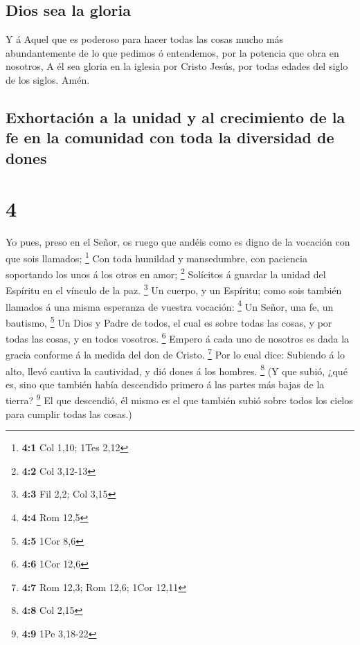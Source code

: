 \hypertarget{dios-sea-la-gloria}{%
\subsection{Dios sea la gloria}\label{dios-sea-la-gloria}}

 Y á Aquel que es poderoso para hacer todas las cosas mucho
más abundantemente de lo que pedimos ó entendemos, por la potencia que
obra en nosotros,  A él sea gloria en la iglesia por Cristo
Jesús, por todas edades del siglo de los siglos. Amén.

\hypertarget{exhortaciuxf3n-a-la-unidad-y-al-crecimiento-de-la-fe-en-la-comunidad-con-toda-la-diversidad-de-dones}{%
\subsection{Exhortación a la unidad y al crecimiento de la fe en la
comunidad con toda la diversidad de
dones}\label{exhortaciuxf3n-a-la-unidad-y-al-crecimiento-de-la-fe-en-la-comunidad-con-toda-la-diversidad-de-dones}}

\hypertarget{section-3}{%
\section{4}\label{section-3}}

 Yo pues, preso en el Señor, os ruego que andéis como es
digno de la vocación con que sois llamados; \footnote{\textbf{4:1} Col
  1,10; 1Tes 2,12}  Con toda humildad y mansedumbre, con
paciencia soportando los unos á los otros en amor; \footnote{\textbf{4:2}
  Col 3,12-13}  Solícitos á guardar la unidad del Espíritu
en el vínculo de la paz. \footnote{\textbf{4:3} Fil 2,2; Col 3,15}
 Un cuerpo, y un Espíritu; como sois también llamados á una
misma esperanza de vuestra vocación: \footnote{\textbf{4:4} Rom 12,5}
 Un Señor, una fe, un bautismo, \footnote{\textbf{4:5} 1Cor
  8,6}  Un Dios y Padre de todos, el cual es sobre todas las
cosas, y por todas las cosas, y en todos vosotros. \footnote{\textbf{4:6}
  1Cor 12,6}  Empero á cada uno de nosotros es dada la
gracia conforme á la medida del don de Cristo. \footnote{\textbf{4:7}
  Rom 12,3; Rom 12,6; 1Cor 12,11}  Por lo cual dice:
Subiendo á lo alto, llevó cautiva la cautividad, y dió dones á los
hombres. \footnote{\textbf{4:8} Col 2,15}  (Y que subió,
¿qué es, sino que también había descendido primero á las partes más
bajas de la tierra? \footnote{\textbf{4:9} 1Pe 3,18-22}  El
que descendió, él mismo es el que también subió sobre todos los cielos
para cumplir todas las cosas.)

